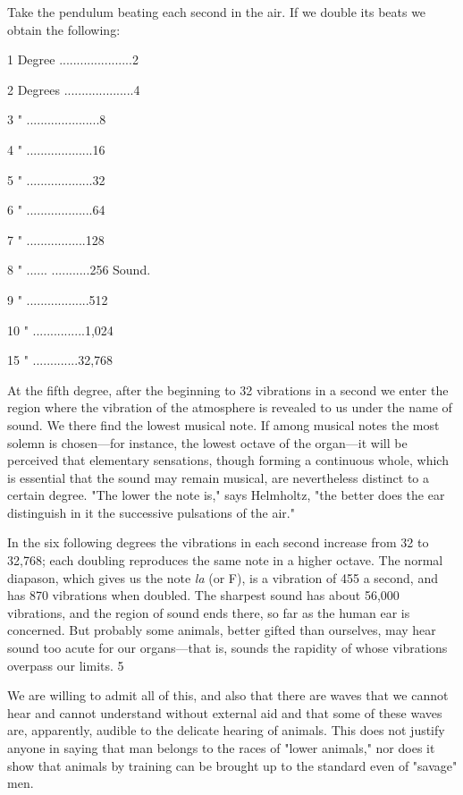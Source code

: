 Take the pendulum beating each second in the air. If we double its beats we obtain the
following:

1 Degree .....................2

2 Degrees ....................4

3 " .....................8

4 " ...................16

5 " ...................32

6 " ...................64

7 " .................128

8 " ...... ...........256 Sound.

9 " ..................512

10 " ...............1,024

15 " .............32,768

At the fifth degree, after the beginning to 32 vibrations in a second we enter the region where
the vibration of the atmosphere is revealed to us under the name of sound. We there find the
lowest musical note. If among musical notes the most solemn is chosen—for instance, the
lowest octave of the organ—it will be perceived that elementary sensations, though forming a
continuous whole, which is essential that the sound may remain musical, are nevertheless
distinct to a certain degree. "The lower the note is," says Helmholtz, "the better does the ear
distinguish in it the successive pulsations of the air."

In the six following degrees the vibrations in each second increase from 32 to 32,768; each
doubling reproduces the same note in a higher octave. The normal diapason, which gives us
the note \textit{la} (or F), is a vibration of 455 a second, and has 870 vibrations when doubled. The
sharpest sound has about 56,000 vibrations, and the region of sound ends there, so far as the
human ear is concerned. But probably some animals, better gifted than ourselves, may hear
sound too acute for our organs—that is, sounds the rapidity of whose vibrations overpass our
limits. 5

We are willing to admit all of this, and also that there are waves that we cannot hear and
cannot understand without external aid and that some of these waves are, apparently, audible
to the delicate hearing of animals. This does not justify anyone in saying that man belongs to
the races of "lower animals," nor does it show that animals by training can be brought up to
the standard even of "savage" men.

